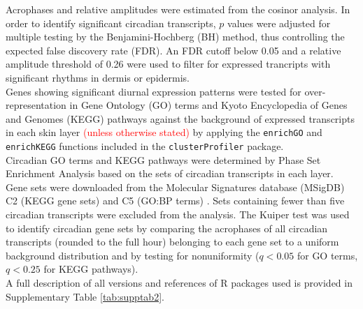 Acrophases and relative amplitudes were estimated from the cosinor analysis. In order to identify significant circadian transcripts, $p$ values were adjusted for multiple testing by the Benjamini-Hochberg (BH) method, thus controlling the expected false discovery rate (FDR). An FDR cutoff below 0.05 and a relative amplitude threshold of 0.26 were used to filter for expressed trancripts with significant rhythms in dermis or epidermis. \\

Genes showing significant diurnal expression patterns were tested for over-representation in Gene Ontology (GO) terms and Kyoto Encyclopedia of Genes and Genomes (KEGG) pathways against the background of expressed transcripts in each skin layer \textcolor{red}{(unless otherwise stated)} by applying the \texttt{enrichGO} and \texttt{enrichKEGG} functions included in the \texttt{clusterProfiler} package. \\

Circadian GO terms and KEGG pathways were determined by Phase Set Enrichment Analysis \cite{Zhang2016} based on the sets of circadian transcripts in each layer. Gene sets were downloaded from the Molecular Signatures database (MSigDB) C2 (KEGG gene sets) and C5 (GO:BP terms) \cite{Subramanian2005}. Sets containing fewer than five circadian transcripts were excluded from the analysis. The Kuiper test was used to identify circadian gene sets by comparing the acrophases of all circadian transcripts (rounded to the full hour) belonging to each gene set to a uniform background distribution and by testing for nonuniformity ($q<0.05$ for GO terms, $q<0.25$ for KEGG pathways).\\

A full description of all versions and references of R packages used is provided in Supplementary Table \ref{tab:supptab2}. 

